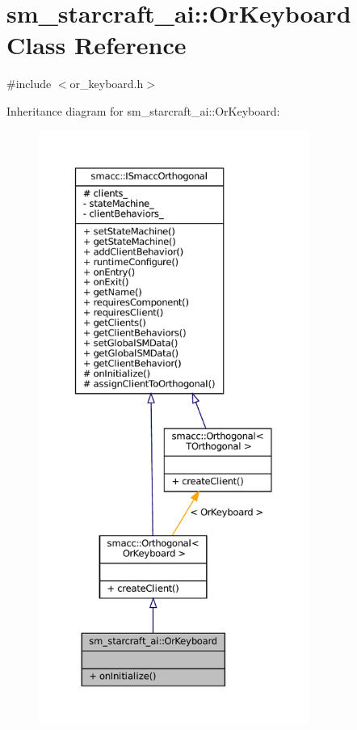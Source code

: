 \hypertarget{classsm__starcraft__ai_1_1OrKeyboard}{}\section{sm\+\_\+starcraft\+\_\+ai\+:\+:Or\+Keyboard Class Reference}
\label{classsm__starcraft__ai_1_1OrKeyboard}


{\ttfamily \#include $<$or\+\_\+keyboard.\+h$>$}



Inheritance diagram for sm\+\_\+starcraft\+\_\+ai\+:\+:Or\+Keyboard\+:
\nopagebreak
\begin{figure}[H]
\begin{center}
\leavevmode
\includegraphics[height=550pt]{classsm__starcraft__ai_1_1OrKeyboard__inherit__graph}
\end{center}
\end{figure}


